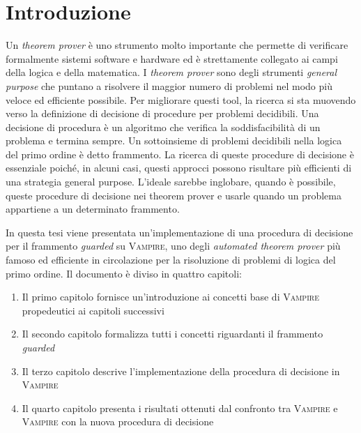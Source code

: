 \pagestyle{introduction}
\chapter*{Introduzione}
Un \emph{theorem prover} è uno strumento molto importante che permette di verificare formalmente 
sistemi software e hardware ed è strettamente collegato ai campi della logica e della matematica.
I \emph{theorem prover} sono degli strumenti \emph{general purpose} che puntano a risolvere il maggior numero di problemi nel modo più veloce 
ed efficiente possibile. Per migliorare questi tool, la ricerca si sta muovendo verso la definizione di 
decisione di procedure per problemi decidibili. Una decisione di procedura è un algoritmo che verifica 
la soddisfacibilità di un problema e termina sempre. Un sottoinsieme di problemi decidibili nella logica del primo ordine è detto 
frammento. La ricerca di queste procedure di decisione è essenziale poiché, in alcuni casi, questi approcci possono risultare 
più efficienti di una strategia general purpose. L'ideale sarebbe inglobare, quando è possibile, queste procedure di decisione nei 
theorem prover e usarle quando un problema appartiene a un determinato frammento.

In questa tesi viene presentata un'implementazione di una procedura di decisione per il frammento \emph{guarded} su   
\textsc{Vampire}, uno degli \emph{automated theorem prover} più famoso ed efficiente in circolazione per la risoluzione di 
problemi di logica del primo ordine. Il documento è diviso in quattro capitoli: 
\begin{enumerate}
    \item Il primo capitolo fornisce un'introduzione ai concetti base di \textsc{Vampire} propedeutici ai capitoli successivi
    \item Il secondo capitolo formalizza tutti i concetti riguardanti il frammento \emph{guarded}
    \item Il terzo capitolo descrive l'implementazione della procedura di decisione in \textsc{Vampire}
    \item Il quarto capitolo presenta i risultati ottenuti dal confronto tra \textsc{Vampire} e \textsc{Vampire} con la nuova procedura di decisione
\end{enumerate}

